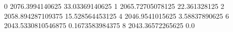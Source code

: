 0 2076.3994140625 33.03369140625
1 2065.72705078125 22.361328125
2 2058.894287109375 15.528564453125
4 2046.9541015625 3.58837890625
6 2043.5330810546875 0.1673583984375
8 2043.36572265625 0.0
